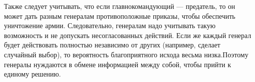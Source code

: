 Также следует учитывать, что если главнокомандующий — предатель, то он может дать разным генералам противоположные приказы, чтобы обеспечить уничтожение армии. Следовательно, генералам надо учитывать такую возможность и не допускать несогласованных действий. Если же каждый генерал будет действовать полностью независимо от других (например, сделает случайный выбор), то вероятность благоприятного исхода весьма низка.Поэтому генералы нуждаются в обмене информацией между собой, чтобы прийти к единому решению. 
